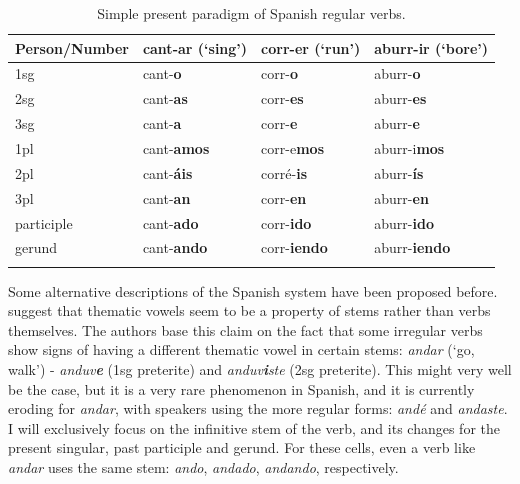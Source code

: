 \begin{table}
  \centering
  \begin{tabular}{llll}
    \lsptoprule
    Person/Number & cant-ar (`sing') & corr-er (`run')     & aburr-ir (`bore')    \\
    \midrule
    1sg           & cant-\textbf{o}           & corr-\textbf{o}     & aburr-\textbf{o}     \\
    2sg           & cant-\textbf{as}          & corr-\textbf{es}    & aburr-\textbf{es}    \\
    3sg           & cant-\textbf{a}           & corr-\textbf{e}     & aburr-\textbf{e}     \\
    1pl           & cant-\textbf{amos}        & corr-e\textbf{mos}  & aburr-i\textbf{mos}  \\
    2pl           & cant-\textbf{áis}         & corré-\textbf{is}   & aburr-\textbf{ís}    \\
    3pl           & cant-\textbf{an}          & corr-\textbf{en}    & aburr-\textbf{en}    \\
    participle    & cant-\textbf{ado}         & corr-\textbf{ido}   & aburr-\textbf{ido}   \\
    gerund        & cant-\textbf{ando}        & corr-\textbf{iendo} & aburr-\textbf{iendo} \\
    \lspbottomrule
  \end{tabular}\caption{Simple present paradigm of Spanish regular verbs.}\label{tab:sp-verb-paradigm}
\end{table}

Some alternative descriptions of the Spanish system have been proposed before. \textcite{Boye.2006} suggest that thematic vowels seem to be a property of stems rather than verbs themselves. The authors base this claim on the fact that some irregular verbs show signs of having a different thematic vowel in certain stems: \textit{andar} (`go, walk') - \textit{anduv\textbf{e}} (1sg preterite) and \textit{anduv\textbf{i}ste} (2sg preterite). This might very well be the case, but it is a very  rare phenomenon in Spanish, and it is currently eroding for \textit{andar}, with speakers using the more regular forms: \textit{andé} and \textit{andaste}. I will exclusively focus on the infinitive stem of the verb, and its changes for the present singular, past participle and gerund. For these cells, even a verb like \textit{andar} uses the same stem: \textit{ando}, \textit{andado}, \textit{andando}, respectively.

